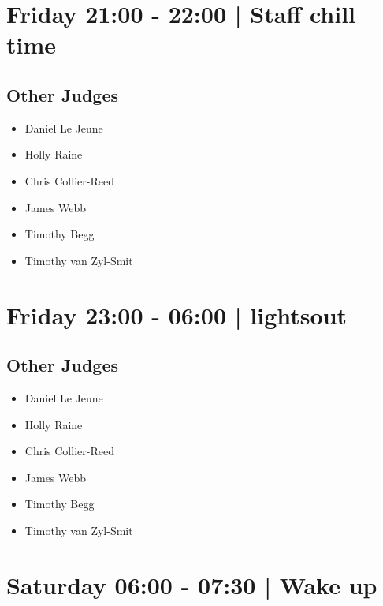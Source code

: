 \documentclass[10pt, A5]{article}
\begin{document}
            \section*{Friday 21:00
        -
        22:00
        |
         Staff chill time}
        
                
        \subsection*{Other Judges}
        
            \begin{itemize}
                            \item Daniel Le Jeune
                            \item Holly Raine
                            \item Chris Collier-Reed
                            \item James Webb
                            \item Timothy Begg
                            \item Timothy van Zyl-Smit
                        \end{itemize}
        

            \section*{Friday 23:00
        -
        06:00
        |
         lightsout}
        
                
        \subsection*{Other Judges}
        
            \begin{itemize}
                            \item Daniel Le Jeune
                            \item Holly Raine
                            \item Chris Collier-Reed
                            \item James Webb
                            \item Timothy Begg
                            \item Timothy van Zyl-Smit
                        \end{itemize}
        

            \section*{Saturday 06:00
        -
        07:30
        |
         Wake up}
        
\end{document}
